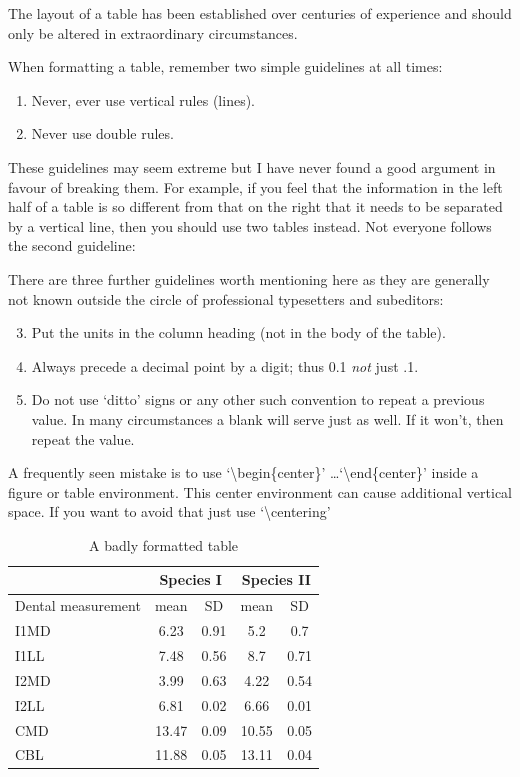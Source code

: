 \documentclass[a4paper,12pt,times,print,index,custombib,custommargin]{PhDThesisPSnPDF}\usepackage[]{graphicx}\usepackage[]{color}
\begin{document}
The layout of a table has been established over centuries of experience and 
should only be altered in extraordinary circumstances. 

When formatting a table, remember two simple guidelines at all times:

\begin{enumerate}
  \item Never, ever use vertical rules (lines).
  \item Never use double rules.
\end{enumerate}

These guidelines may seem extreme but I have
never found a good argument in favour of breaking them. For
example, if you feel that the information in the left half of
a table is so different from that on the right that it needs
to be separated by a vertical line, then you should use two
tables instead. Not everyone follows the second guideline:

There are three further guidelines worth mentioning here as they
are generally not known outside the circle of professional
typesetters and subeditors:

\begin{enumerate}\setcounter{enumi}{2}
  \item Put the units in the column heading (not in the body of
          the table).
  \item Always precede a decimal point by a digit; thus 0.1
      {\em not} just .1.
  \item Do not use `ditto' signs or any other such convention to
      repeat a previous value. In many circumstances a blank
      will serve just as well. If it won't, then repeat the value.
\end{enumerate}

A frequently seen mistake is to use `\textbackslash begin\{center\}' \dots `\textbackslash end\{center\}' inside a figure or table environment. This center environment can cause additional vertical space. If you want to avoid that just use `\textbackslash centering'


\begin{table}
\caption{A badly formatted table}
\centering
\label{table:bad_table}
\begin{tabular}{|l|c|c|c|c|}
\hline 
& \multicolumn{2}{c}{Species I} & \multicolumn{2}{c|}{Species II} \\ 
\hline
Dental measurement  & mean & SD  & mean & SD  \\ \hline 
\hline
I1MD & 6.23 & 0.91 & 5.2  & 0.7  \\
\hline 
I1LL & 7.48 & 0.56 & 8.7  & 0.71 \\
\hline 
I2MD & 3.99 & 0.63 & 4.22 & 0.54 \\
\hline 
I2LL & 6.81 & 0.02 & 6.66 & 0.01 \\
\hline 
CMD & 13.47 & 0.09 & 10.55 & 0.05 \\
\hline 
CBL & 11.88 & 0.05 & 13.11 & 0.04\\ 
\hline 
\end{tabular}
\end{table}
\end{document}
